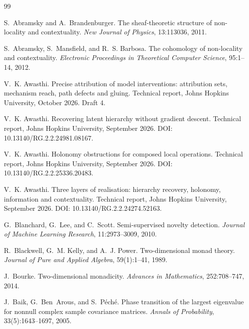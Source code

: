 \documentclass[11pt]{article}
\theoremstyle{definition}
\theoremstyle{remark}
\begin{document}
\begin{thebibliography}{99}

S.~Abramsky and A.~Brandenburger.
\newblock The sheaf-theoretic structure of non-locality and contextuality.
\newblock \emph{New Journal of Physics}, 13:113036, 2011.

S.~Abramsky, S.~Mansfield, and R.~S. Barbosa.
\newblock The cohomology of non-locality and contextuality.
\newblock \emph{Electronic Proceedings in Theoretical Computer Science}, 95:1--14, 2012.

V.~K. Awasthi.
\newblock Precise attribution of model interventions: attribution sets, mechanism reach, path defects
and gluing.
\newblock Technical report, Johns Hopkins University, October 2026. Draft 4.

V.~K. Awasthi.
\newblock Recovering latent hierarchy without gradient descent.
\newblock Technical report, Johns Hopkins University, September 2026.
\newblock DOI: 10.13140/RG.2.2.24981.08167.

V.~K. Awasthi.
\newblock Holonomy obstructions for composed local operations.
\newblock Technical report, Johns Hopkins University, September 2026.
\newblock DOI: 10.13140/RG.2.2.25336.20483.

V.~K. Awasthi.
\newblock Three layers of realisation: hierarchy recovery, holonomy, information and contextuality.
\newblock Technical report, Johns Hopkins University, September 2026.
\newblock DOI: 10.13140/RG.2.2.24274.52163.

G.~Blanchard, G.~Lee, and C.~Scott.
\newblock Semi-supervised novelty detection.
\newblock \emph{Journal of Machine Learning Research}, 11:2973--3009, 2010.

R.~Blackwell, G.~M. Kelly, and A.~J. Power.
\newblock Two-dimensional monad theory.
\newblock \emph{Journal of Pure and Applied Algebra}, 59(1):1--41, 1989.

J.~Bourke.
\newblock Two-dimensional monadicity.
\newblock \emph{Advances in Mathematics}, 252:708--747, 2014.

J.~Baik, G.~Ben~Arous, and S.~P\'ech\'e.
\newblock Phase transition of the largest eigenvalue for nonnull complex sample covariance matrices.
\newblock \emph{Annals of Probability}, 33(5):1643--1697, 2005.


\end{thebibliography}
\end{document}
